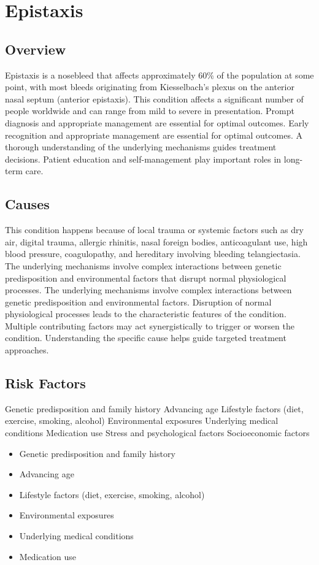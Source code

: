 \chapter{Epistaxis}
\label{sec:Epistaxis}

\section{Overview}
Epistaxis is a nosebleed that affects approximately 60\% of the population at some point, with most bleeds originating from Kiesselbach's plexus on the anterior nasal septum (anterior epistaxis). This condition affects a significant number of people worldwide and can range from mild to severe in presentation. Prompt diagnosis and appropriate management are essential for optimal outcomes. Early recognition and appropriate management are essential for optimal outcomes. A thorough understanding of the underlying mechanisms guides treatment decisions. Patient education and self-management play important roles in long-term care.
\section{Causes}
This condition happens because of local trauma or systemic factors such as dry air, digital trauma, allergic rhinitis, nasal foreign bodies, anticoagulant use, high blood pressure, coagulopathy, and hereditary involving bleeding telangiectasia. The underlying mechanisms involve complex interactions between genetic predisposition and environmental factors that disrupt normal physiological processes. The underlying mechanisms involve complex interactions between genetic predisposition and environmental factors. Disruption of normal physiological processes leads to the characteristic features of the condition. Multiple contributing factors may act synergistically to trigger or worsen the condition. Understanding the specific cause helps guide targeted treatment approaches.
\section{Risk Factors}
Genetic predisposition and family history Advancing age Lifestyle factors (diet, exercise, smoking, alcohol) Environmental exposures Underlying medical conditions Medication use Stress and psychological factors Socioeconomic factors

\begin{itemize}[noitemsep]
  \item Genetic predisposition and family history
  \item Advancing age
  \item Lifestyle factors (diet, exercise, smoking, alcohol)
  \item Environmental exposures
  \item Underlying medical conditions
  \item Medication use
\end{itemize}
